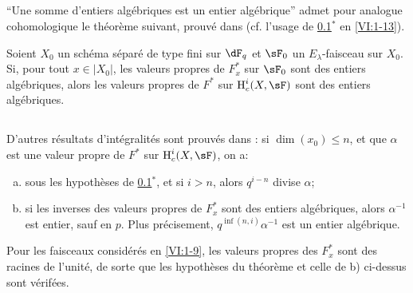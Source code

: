 \subsection{}\label{VI:2-1}

``Une somme d'entiers alg\'ebriques est un entier alg\'ebrique'' admet pour 
analogue cohomologique le th\'eor\`eme suivant, prouv\'e dans 
\cite[XXI 5.2.2]{sga7} (cf. l'usage de \ref{VI:2-1}$^\ast$ en 
\ref{VI:1-13}). 




\addtocounter{subsection}{-1}
\begin{theorem_}[$\ast$]\label{VI:2-1*}
Soient $X_0$ un sch\'ema s\'epar\'e de type fini sur $\dF_q$ et $\sF_0$ un 
$E_\lambda$-faisceau sur $X_0$. Si, pour tout $x\in |X_0|$, les valeurs 
propres de $F_x^\ast$ sur $\sF_0$ sont des entiers alg\'ebriques, alors les 
valeurs propres de $F^\ast$ sur $\h_c^i(X,\sF)$ sont des entiers alg\'ebriques. 
\end{theorem_}





\subsection{}\label{VI:2-2}

D'autres r\'esultats d'int\'egralit\'es sont prouv\'es dans 
\cite[XXI, 5.2.2 et 5.4]{sga7}: si $\dim(x_0)\leqslant n$, et que $\alpha$ est 
une valeur propre de $F^\ast$ sur $\h_c^i(X,\sF)$, on a: 
\begin{enumerate}[a)]
  \item sous les hypoth\`eses de \ref{VI:2-1}$^\ast$, et si $i>n$, alors 
    $q^{i-n}$ divise $\alpha$;
  \item si les inverses des valeurs propres de $F_x^\ast$ sont des entiers 
    alg\'ebriques, alors $\alpha^{-1}$ est entier, sauf en $p$. Plus 
    pr\'ecisement, $q^{\inf(n,i)}\alpha^{-1}$ est un entier alg\'ebrique. 
\end{enumerate}

Pour les faisceaux consid\'er\'es en \ref{VI:1-9}, les valeurs propres des 
$F_x^\ast$ sont des racines de l'unit\'e, de sorte que les hypoth\`eses du 
th\'eor\`eme et celle de b) ci-dessus sont v\'erif\'ees. 





\subsection{}\label{VI:2-3}

